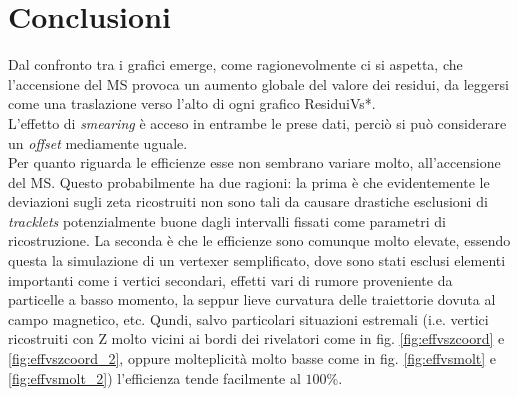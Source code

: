 \documentclass{article}
\begin{document}
\section{Conclusioni}
Dal confronto tra i grafici emerge, come ragionevolmente ci si aspetta, che l'accensione del MS provoca un aumento globale del valore dei residui, da leggersi come una traslazione verso l'alto di ogni grafico ResiduiVs*.\\
L'effetto di \textit{smearing} è acceso in entrambe le prese dati, perciò si può considerare un \textit{offset} mediamente uguale.\\
\indent Per quanto riguarda le efficienze esse non sembrano variare molto, all'accensione del MS. Questo probabilmente ha due ragioni: la prima è che evidentemente le deviazioni sugli zeta ricostruiti non sono tali da causare drastiche esclusioni di \textit{tracklets} potenzialmente buone dagli intervalli fissati come parametri di ricostruzione. La seconda è che le efficienze sono comunque molto elevate, essendo questa la simulazione di un vertexer semplificato, dove sono stati esclusi elementi importanti come i vertici secondari, effetti vari di rumore proveniente da particelle a basso momento, la seppur lieve curvatura delle traiettorie dovuta al campo magnetico, etc.  
Qundi, salvo particolari situazioni estremali (i.e. vertici ricostruiti con Z molto vicini ai bordi dei rivelatori come in fig.
\ref{fig:effvszcoord} e \ref{fig:effvszcoord_2}, oppure molteplicità molto basse  come in fig. \ref{fig:effvsmolt} e \ref{fig:effvsmolt_2}) l'efficienza tende facilmente al $100\%$.
\end{document}
